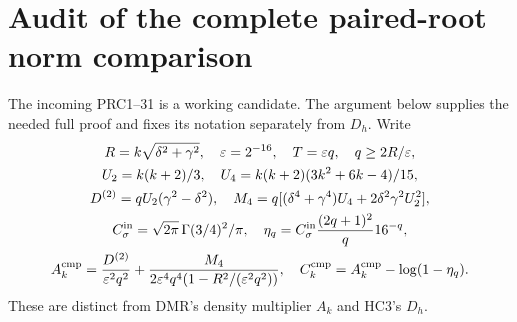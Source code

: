 \section{Audit of the complete paired-root norm comparison}
\label{sec:sr-prc}
The incoming PRC1--31 is a working candidate. The argument below supplies the needed full proof and fixes its notation separately from $D_h$. Write
\begin{equation}\label{eq:sr-prcconstants}
\begin{gathered}
 R=k\sqrt{\delta^2+\gamma^2},\quad \varepsilon=2^{-16},\quad T=\varepsilon q,
 \quad q\ge2R/\varepsilon,\\
 U_2=k(k+2)/3,\quad U_4=k(k+2)(3k^2+6k-4)/15,\\
 D^{(2)}=qU_2(\gamma^2-\delta^2),\quad
 M_4=q[(\delta^4+\gamma^4)U_4+2\delta^2\gamma^2U_2^2],\\
 C_\sigma^{\rm in}=\sqrt{2\pi}\,\Gamma(3/4)^2/\pi,\quad
 \eta_q=C_\sigma^{\rm in}\frac{(2q+1)^2}{q}16^{-q},\\
 A_k^{\rm cmp}=\frac{D^{(2)}}{\varepsilon^2q^2}
 +\frac{M_4}{2\varepsilon^4q^4(1-R^2/(\varepsilon^2q^2))},\quad
 C_k^{\rm cmp}=A_k^{\rm cmp}-\log(1-\eta_q).
\end{gathered}
\end{equation}
These are distinct from DMR's density multiplier $A_k$ and HC3's $D_h$.

